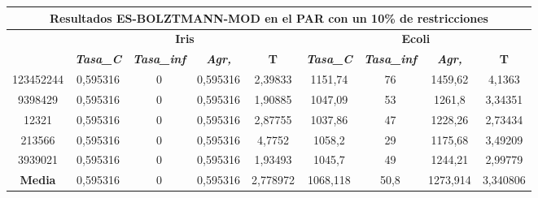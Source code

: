 \documentclass[12pt, spanish]{article}
\begin{document}
\begin{table}[H]
\begin{tabular}{|c|c|c|c|c|c|c|c|c|}
\hline
\multicolumn{9}{|c|}{\textbf{Resultados ES-BOLZTMANN-MOD en el PAR con un 10\% de restricciones}}                                                                                                                 \\ \hline
\multirow{2}{*}{} & \multicolumn{4}{c|}{\textbf{Iris}}                                                            & \multicolumn{4}{c|}{\textbf{Ecoli}}                                                           \\ \cline{2-9} 
                  & \textit{\textbf{Tasa\_C}} & \textit{\textbf{Tasa\_inf}} & \textit{\textbf{Agr,}} & \textbf{T} & \textit{\textbf{Tasa\_C}} & \textit{\textbf{Tasa\_inf}} & \textit{\textbf{Agr,}} & \textbf{T} \\ \hline
123452244         & 0,595316                  & 0                           & 0,595316               & 2,39833    & 1151,74                   & 76                          & 1459,62                & 4,1363     \\ \hline
9398429           & 0,595316                  & 0                           & 0,595316               & 1,90885    & 1047,09                   & 53                          & 1261,8                 & 3,34351    \\ \hline
12321             & 0,595316                  & 0                           & 0,595316               & 2,87755    & 1037,86                   & 47                          & 1228,26                & 2,73434    \\ \hline
213566            & 0,595316                  & 0                           & 0,595316               & 4,7752     & 1058,2                    & 29                          & 1175,68                & 3,49209    \\ \hline
3939021           & 0,595316                  & 0                           & 0,595316               & 1,93493    & 1045,7                    & 49                          & 1244,21                & 2,99779    \\ \hline
\textbf{Media}    & 0,595316                  & 0                           & 0,595316               & 2,778972   & 1068,118                  & 50,8                        & 1273,914               & 3,340806   \\ \hline
\end{tabular}
\end{table}
\end{document}
